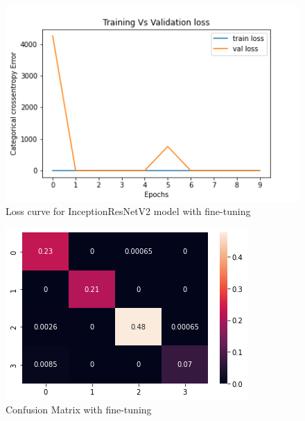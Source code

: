\documentclass{report}
\begin{document}
\begin{figure}[H]
\centering
\includegraphics[width=\textwidth]{LossVal_FineTuneInceptionResNetV2.png}
\caption{ Loss curve for InceptionResNetV2 model with fine-tuning}
\label{fig:Unfroozen2}
\end{figure}



\begin{figure}[H]
\centering
\includegraphics[width=\textwidth]{CFinetuning.png}
\caption{Confusion Matrix with fine-tuning}
\label{fig:CM}
\end{figure}

\hfill
\end{document}
